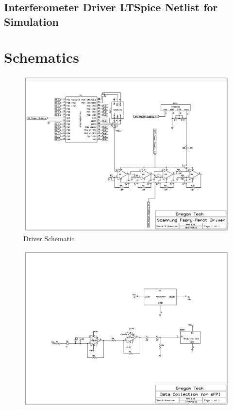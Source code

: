 \documentclass[12pt,journal]{IEEEtran}
\newcommand\ltspicestyle{\lstset{
language=Clean, 
basicstyle=\scriptsize
}}
\newcommand\ltspiceexternal[2][]{{
\ltspicestyle
}}
\begin{document}
\begin{appendices}
\subsection{Interferometer Driver LTSpice Netlist for Simulation}
\ltspiceexternal{../Electrical_Design/Amplifier_Design/amplifier_setup_rev2.txt}
\newpage

\section{Schematics}

\begin{figure}[h!]
	\centering
	\includegraphics[width=\textwidth]{schematic-driver.png}
	\caption[Block Diagram]{Driver Schematic}
	\label{schm:driver-schematic}
\end{figure}
\newpage
\begin{figure}[h!]
	\centering
	\includegraphics[width=\textwidth]{schematic-photodiode.png}

\end{figure}
\end{appendices}
\end{document}
